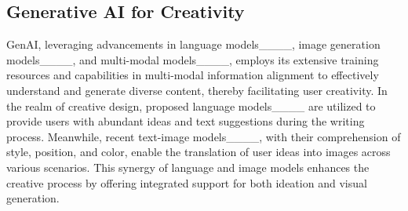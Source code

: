 \subsection{Generative AI for Creativity}
GenAI, leveraging advancements in language models____, image generation models____, and multi-modal models____, employs its extensive training resources and capabilities in multi-modal information alignment to effectively understand and generate diverse content, thereby facilitating user creativity. In the realm of creative design, proposed language models____  are utilized to provide users with abundant ideas and text suggestions during the writing process. Meanwhile, recent text-image models____, with their comprehension of style, position, and color, enable the translation of user ideas into images across various scenarios. This synergy of language and image models enhances the creative process by offering integrated support for both ideation and visual generation.






